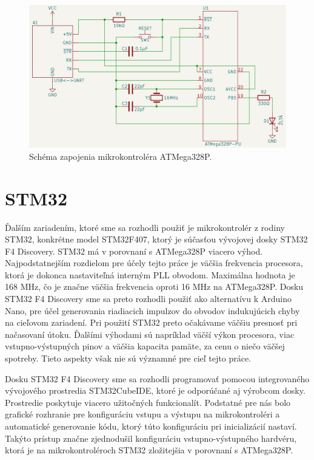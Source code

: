 \begin{figure}
    \centerline{\includegraphics[width=1\textwidth]{images/schemeATMega.png}}
    \caption[Schéma zapojenia mikrokontroléra ATMega328P]{Schéma zapojenia mikrokontroléra ATMega328P.}
    \label{obr:schemeATMega}
\end{figure}

\section{STM32} \label{kap2:sek:STM32}
Ďalším zariadením, ktoré sme sa rozhodli použiť je mikrokontrolér z rodiny STM32, konkrétne model STM32F407, ktorý je súčasťou vývojovej dosky STM32 F4 Discovery. STM32 má v porovnaní s ATMega328P viacero výhod. Najpodstatnejším rozdielom pre účely tejto práce je väčšia frekvencia procesora, ktorá je dokonca nastaviteľná interným PLL obvodom. Maximálna hodnota je 168 MHz, čo je značne väčšia frekvencia oproti 16 MHz na ATMega328P. Dosku STM32 F4 Discovery sme sa preto rozhodli použiť ako alternatívu k Arduino Nano, pre účel generovania riadiacich impulzov do obvodov indukujúcich chyby na cieľovom zariadení. Pri použití STM32 preto očakávame väčšiu presnosť pri načasovaní útoku. Ďalšími výhodami sú napríklad väčší výkon procesora, viac vstupno-výstupných pinov a väčšia kapacita pamäte, za cenu o niečo väčšej spotreby. Tieto aspekty však nie sú významné pre cieľ tejto práce.

Dosku STM32 F4 Discovery sme sa rozhodli programovať pomocou integrovaného vývojového prostredia STM32CubeIDE, ktoré je odporúčané aj výrobcom dosky. Prostredie poskytuje viacero užitočných funkcionalít. Podstatné pre nás bolo grafické rozhranie pre konfiguráciu vstupu a výstupu na mikrokontroléri a automatické generovanie kódu, ktorý túto konfiguráciu pri inicializácií nastaví. Takýto prístup značne zjednodušil konfiguráciu vstupno-výstupného hardvéru, ktorá je na mikrokontroléroch STM32 zložitejšia v porovnaní s ATMega328P.

